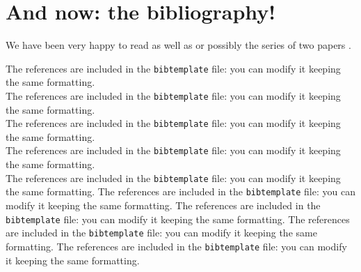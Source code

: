 \documentclass[11pt,english]{smfart}
\theoremstyle{definition}
\theoremstyle{remark}
\begin{document}
\section{And now: the bibliography!}
We have been very happy to read \cite{GMP81} as well as \cite[Theorem~2.5]{BMM94} or possibly the series of two papers \cite{GS,GS82}.

The references are included in the \texttt{bibtemplate} file: you can modify it keeping the same formatting.\\
The references are included in the \texttt{bibtemplate} file: you can modify it keeping the same formatting.\\
The references are included in the \texttt{bibtemplate} file: you can modify it keeping the same formatting.\\
The references are included in the \texttt{bibtemplate} file: you can modify it keeping the same formatting.\\
The references are included in the \texttt{bibtemplate} file: you can modify it keeping the same formatting.
The references are included in the \texttt{bibtemplate} file: you can modify it keeping the same formatting.
The references are included in the \texttt{bibtemplate} file: you can modify it keeping the same formatting.
The references are included in the \texttt{bibtemplate} file: you can modify it keeping the same formatting.
The references are included in the \texttt{bibtemplate} file: you can modify it keeping the same formatting.

\end{document}
